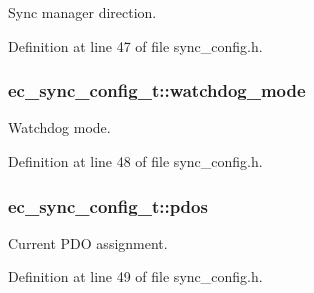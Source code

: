 Sync manager direction. 



Definition at line 47 of file sync\-\_\-config.\-h.

\subsubsection[{watchdog\-\_\-mode}]{ ec\-\_\-sync\-\_\-config\-\_\-t\-::watchdog\-\_\-mode}\label{structec__sync__config__t_a83c2bcdf7c5a9e6541b5f47c13a4d46d}


Watchdog mode. 



Definition at line 48 of file sync\-\_\-config.\-h.

\subsubsection[{pdos}]{ ec\-\_\-sync\-\_\-config\-\_\-t\-::pdos}\label{structec__sync__config__t_ae70642198065ad0381dacdfa21fcebaa}


Current P\-D\-O assignment. 



Definition at line 49 of file sync\-\_\-config.\-h.

